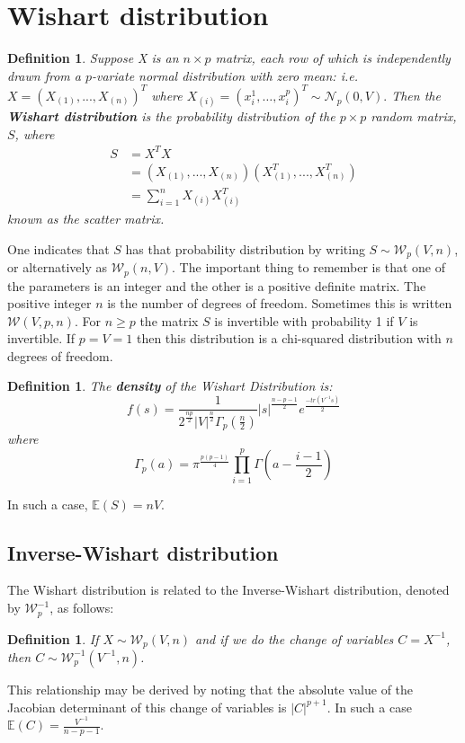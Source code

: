 \documentclass[12pt, leqno]{article}
\providecommand{\abs}[1]{\lvert#1\rvert}
\newtheorem{defn}[thm]{Definition}
\begin{document}
\section{Wishart distribution} 
\begin{defn}
\label{defn:wishp}
Suppose X is an $n \times p$ matrix, each row of which is independently
 drawn from a $p$-variate normal distribution with zero mean: i.e. $X
 = (X_{(1)},...,X_{(n)})^T$ where
$X_{(i)}{=}(x_i^1,\dots,x_i^p)^T\sim \mathcal{N}_p(0,V).$
Then the \textbf{Wishart distribution} is the probability distribution of the
$p \times p$ random matrix, $S$, where  
\begin{align*}
S &= X^TX \\
&= (X_{(1)},...,X_{(n)})
(X_{(1)}^T,...,X_{(n)}^T) \\
&= \sum_{i=1}^n X_{(i)}X_{(i)}^T
\end{align*} 
known as the scatter matrix. 
\end{defn}
One indicates that $S$ has that probability distribution by writing
$S\sim  \mathcal{W}_p(V,n)$, or alternatively as
$\mathcal{W}_p(n,V)$. The important thing to remember is that one of
the parameters is an integer and the other is a positive definite
matrix. The positive integer $n$ is the number of 
degrees of freedom. Sometimes this is written $\mathcal{W}(V, p, n)$. 
For $n \geq p$ the matrix $S$ is invertible with probability 1 if $V$ is invertible.
If $p = V = 1$ then this distribution is a chi-squared
 distribution with $n$ degrees of freedom. 
\begin{defn}
The \textbf{density} of the Wishart
 Distribution is:
\[
f(s) = \frac{1}{2^{\frac{np}{2}}\abs{V}^{\frac{n}{2}}\Gamma_p({\frac{n}{2}})}\abs{s}^{\frac{n-p-1}{2}}e^{\frac{-tr(V^{-1}s)}{2}}
\]
where
\[
\Gamma_p(a) = \pi^{\frac{p(p-1)}{4}}\prod_{i=1}^p \Gamma(a-\frac{i-1}{2})
\]
\end{defn}
In such a case, $\mathbb{E}(S) = nV$.
\subsection{Inverse-Wishart distribution}
The Wishart distribution is related to the Inverse-Wishart
distribution, denoted by 
$\mathcal{W}_p^{-1}$, as follows: 
\begin{defn} If $X \sim \mathcal{W}_p(V, n)$ and
if we do the change of variables $C = X^{-1}$, then $C \sim
\mathcal{W}_p^{-1}({V}^{-1},n)$. 
\end{defn}
This relationship may be derived by
noting that the absolute value of the Jacobian determinant of this
change of variables is $\abs{C}^{p+1}$. In such a case $\mathbb{E}(C) =
\frac{V^{-1}}{n-p-1}$. 
\end{document}
